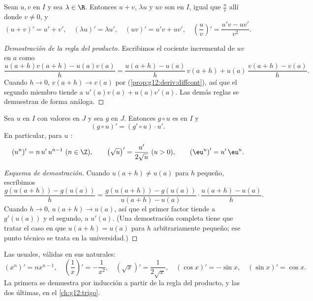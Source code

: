 \begin{proposition}[Operaciones]\label{prop:g12:deriv:operations}
Sean $u, v$  en $I$ y sea $\lambda \in \R$. Entonces $u + v$,
$\lambda u$ y $uv$ son  en $I$, igual que $\frac{u}{v}$ allí
donde $v \neq 0$, y
\[
(u+v)' = u' + v', \quad (\lambda u)' = \lambda u', \quad
(uv)' = u'v + uv', \quad
\left(\frac{u}{v}\right)' = \frac{u'v - uv'}{v^2}.
\]
\end{proposition}

\begin{proof}[Demostración de la regla del producto]
Escribimos el cociente incremental de $uv$ en $a$ como
\[
\frac{u(a+h)v(a+h) - u(a)v(a)}{h}
= \frac{u(a+h) - u(a)}{h}\,v(a+h) + u(a)\,\frac{v(a+h) - v(a)}{h}.
\]
Cuando $h \to 0$, $v(a+h) \to v(a)$ por 
(\cref{prop:g12:deriv:diffcont}), así que el segundo miembro tiende a
$u'(a)v(a) + u(a)v'(a)$. Las demás reglas se demuestran de forma análoga.
\end{proof}

\begin{theorem}\label{thm:g12:deriv:chain}
Sea $u$  en $I$ con valores en $J$ y sea $g$  en $J$.
Entonces $g \circ u$ es  en $I$ y
\[
(g \circ u)' = (g' \circ u) \cdot u' .
\]
En particular, para $u$ :
\[
(u^n)' = n\,u'\,u^{n-1} \ (n \in \Z), \qquad
\left(\sqrt{u}\right)' = \frac{u'}{2\sqrt{u}} \ (u > 0), \qquad
\left(\eu^{u}\right)' = u'\,\eu^{u}.
\]
\end{theorem}

\begin{proof}[Esquema de demostración]
Cuando $u(a+h) \neq u(a)$ para $h$ pequeño, escribimos
\[
\frac{g(u(a+h)) - g(u(a))}{h}
= \frac{g(u(a+h)) - g(u(a))}{u(a+h) - u(a)} \cdot \frac{u(a+h) - u(a)}{h}.
\]
Cuando $h \to 0$, $u(a+h) \to u(a)$, así que el primer factor tiende a
$g'(u(a))$ y el segundo, a $u'(a)$. (Una demostración completa tiene que
tratar el caso en que $u(a+h) = u(a)$ para $h$ arbitrariamente pequeño;
ese punto técnico se trata en la universidad.)
\end{proof}

\begin{example}
Las  usuales, válidas en sus  naturales:
\[
(x^n)' = nx^{n-1}, \quad
\left(\frac{1}{x}\right)' = -\frac{1}{x^2}, \quad
(\sqrt{x})' = \frac{1}{2\sqrt{x}}, \quad
(\cos x)' = -\sin x, \quad
(\sin x)' = \cos x .
\]
La primera se demuestra por inducción a partir de la regla del producto, y
las dos últimas, en el \cref{ch:g12:trigo}.
\end{example}

